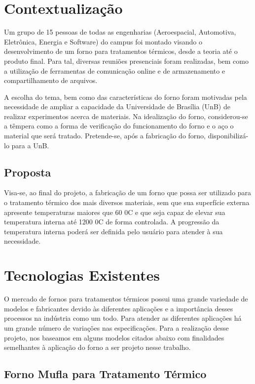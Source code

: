 \section{Contextualização}

Um grupo de 15 pessoas de todas as engenharias (Aeroespacial, Automotiva, Eletrônica, Energia e Software) do campus foi montado visando o desenvolvimento de um forno para tratamentos térmicos, desde a teoria até o produto final. Para tal, diversas reuniões presenciais foram realizadas, bem como a utilização de ferramentas de comunicação online e de armazenamento e compartilhamento de arquivos. 

A escolha do tema, bem como das características do forno foram motivadas pela necessidade de ampliar a capacidade da Universidade de Brasília (UnB) de realizar experimentos acerca de materiais. Na idealização do forno, considerou-se a têmpera como a forma de verificação do funcionamento do forno e o aço o material que será tratado. Pretende-se, após a fabricação do forno, disponibilizá-lo para a UnB.

\subsection{Proposta}

Visa-se, ao final do projeto, a fabricação de um forno que possa ser utilizado para o tratamento térmico dos mais diversos materiais, sem que sua superfície externa apresente temperaturas maiores que 60 0C e que seja capaz de elevar sua temperatura interna até 1200 0C de forma controlada. A progressão da temperatura interna poderá ser definida pelo usuário para atender à sua necessidade.

\section{Tecnologias Existentes}

O mercado de fornos para tratamentos térmicos possui uma grande variedade de modelos e fabricantes devido às diferentes aplicações e a importância desses processos na indústria como um todo. Para atender as diferentes aplicações há um grande número de variações nas especificações. Para a realização desse projeto, nos baseamos em alguns modelos citados abaixo com finalidades semelhantes à aplicação do forno a ser projeto nesse trabalho.

\subsection{Forno Mufla para Tratamento Térmico}

